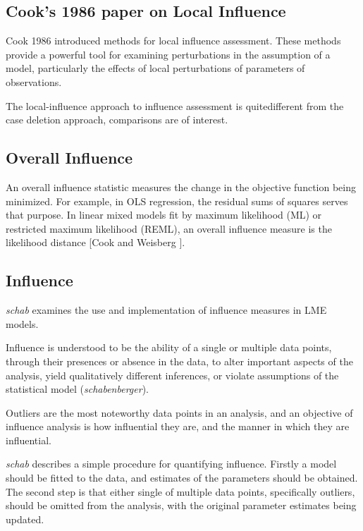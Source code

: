 \documentclass[Main.tex]{subfiles}
\begin{document}
	
	\subsection{Cook's 1986 paper on Local Influence}%
	Cook 1986 introduced methods for local influence assessment. These methods provide a powerful tool for examining perturbations in the assumption of a model, particularly the effects of local perturbations of parameters of observations.
	
	The local-influence approach to influence assessment is quitedifferent from the case deletion approach, comparisons are of
	interest.

				
		
		\subsection{Overall Influence}
		An overall influence statistic measures the change in the objective function being minimized. For example, in
		OLS regression, the residual sums of squares serves that purpose. In linear mixed models fit by
		 maximum likelihood (ML) or  restricted maximum likelihood (REML), an overall influence measure is the  likelihood distance [Cook and Weisberg ].

		
		\subsection{Influence}
		
		\emph{schab} examines the use and implementation of influence measures in LME models.
		
		Influence is understood to be the ability of a single or multiple
		data points, through their presences or absence in the data, to
		alter important aspects of the analysis, yield qualitatively
		different inferences, or violate assumptions of the statistical
		model (\textit{schabenberger}).
		
		Outliers are the most noteworthy data points in an analysis, and
		an objective of influence analysis is how influential they are,
		and the manner in which they are influential.
		
		\emph{schab} describes a simple procedure for quantifying
		influence. Firstly a model should be fitted to the data, and
		estimates of the parameters should be obtained. The second step is
		that either single of multiple data points, specifically outliers,
		should be omitted from the analysis, with the original parameter
		estimates being updated. 
		
\end{document}
